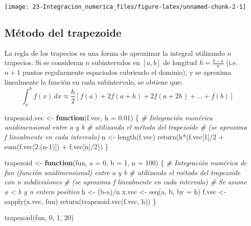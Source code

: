 \documentclass[
]{book}
\newenvironment{Shaded}{\begin{snugshade}}{\end{snugshade}}
\newcommand{\AttributeTok}[1]{\textcolor[rgb]{0.77,0.63,0.00}{#1}}
\newcommand{\CommentTok}[1]{\textcolor[rgb]{0.56,0.35,0.01}{\textit{#1}}}
\newcommand{\ControlFlowTok}[1]{\textcolor[rgb]{0.13,0.29,0.53}{\textbf{#1}}}
\newcommand{\DecValTok}[1]{\textcolor[rgb]{0.00,0.00,0.81}{#1}}
\newcommand{\FloatTok}[1]{\textcolor[rgb]{0.00,0.00,0.81}{#1}}
\newcommand{\FunctionTok}[1]{\textcolor[rgb]{0.00,0.00,0.00}{#1}}
\newcommand{\NormalTok}[1]{#1}
\newcommand{\OtherTok}[1]{\textcolor[rgb]{0.56,0.35,0.01}{#1}}
\newcommand{\SpecialCharTok}[1]{\textcolor[rgb]{0.00,0.00,0.00}{#1}}
\theoremstyle{break}
\theoremstyle{definition}
\theoremstyle{definition}
\theoremstyle{definition}
\theoremstyle{definition}
\theoremstyle{remark}
\begin{document}
\begin{center}\texttt{[image: 23-Integracion\_numerica\_files/figure-latex/unnamed-chunk-2-1]} \end{center}

\hypertarget{muxe9todo-del-trapezoide}{%
\subsection{Método del trapezoide}\label{muxe9todo-del-trapezoide}}

La regla de los trapecios es una forma de aproximar la integral utilizando \(n\) trapecios.
Si se consideran \(n\) subintervalos en \([a,b]\) de longitud \(h= \frac{b-a}{n}\)
(i.e.~\(n + 1\) puntos regularmente espaciados cubriendo el dominio), y
se aproxima linealmente la función en cada subintervalo, se obtiene que:
\[\int_a^b f(x)\, dx \approx \frac{h}{2} [f(a)+2f(a+h)+2f(a+2h)+...+f(b)]\]

\begin{Shaded}
\begin{Highlighting}[]
\NormalTok{trapezoid.vec }\OtherTok{\textless{}{-}} \ControlFlowTok{function}\NormalTok{(f.vec, }\AttributeTok{h =} \FloatTok{0.01}\NormalTok{) \{}
\CommentTok{\# Integración numérica unidimensional entre a y b}
\CommentTok{\# utilizando el método del trapezoide }
\CommentTok{\# (se aproxima f linealmente en cada intervalo)}
\NormalTok{  n }\OtherTok{\textless{}{-}} \FunctionTok{length}\NormalTok{(f.vec) }
  \FunctionTok{return}\NormalTok{(h}\SpecialCharTok{*}\NormalTok{(f.vec[}\DecValTok{1}\NormalTok{]}\SpecialCharTok{/}\DecValTok{2} \SpecialCharTok{+} \FunctionTok{sum}\NormalTok{(f.vec[}\DecValTok{2}\SpecialCharTok{:}\NormalTok{(n}\DecValTok{{-}1}\NormalTok{)]) }\SpecialCharTok{+}\NormalTok{ f.vec[n]}\SpecialCharTok{/}\DecValTok{2}\NormalTok{))}
\NormalTok{\}}

\NormalTok{trapezoid }\OtherTok{\textless{}{-}} \ControlFlowTok{function}\NormalTok{(fun, }\AttributeTok{a =} \DecValTok{0}\NormalTok{, }\AttributeTok{b =} \DecValTok{1}\NormalTok{, }\AttributeTok{n =} \DecValTok{100}\NormalTok{) \{}
\CommentTok{\# Integración numérica de fun (función unidimensional) entre a y b}
\CommentTok{\# utilizando el método del trapezoide con n subdivisiones}
\CommentTok{\# (se aproxima f linealmente en cada intervalo)}
\CommentTok{\# Se asume a \textless{} b y n entero positivo }
\NormalTok{  h }\OtherTok{\textless{}{-}}\NormalTok{ (b}\SpecialCharTok{{-}}\NormalTok{a)}\SpecialCharTok{/}\NormalTok{n}
\NormalTok{  x.vec }\OtherTok{\textless{}{-}} \FunctionTok{seq}\NormalTok{(a, b, }\AttributeTok{by =}\NormalTok{ h)}
\NormalTok{  f.vec }\OtherTok{\textless{}{-}} \FunctionTok{sapply}\NormalTok{(x.vec, fun)}
  \FunctionTok{return}\NormalTok{(}\FunctionTok{trapezoid.vec}\NormalTok{(f.vec, h))}
\NormalTok{\}}

\FunctionTok{trapezoid}\NormalTok{(fun, }\DecValTok{0}\NormalTok{, }\DecValTok{1}\NormalTok{, }\DecValTok{20}\NormalTok{)}
\end{Highlighting}
\end{Shaded}
\end{document}
